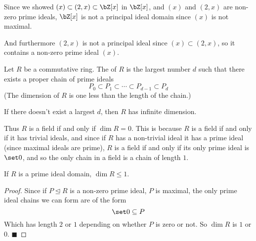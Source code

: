 \documentclass[10pt]{article}
\let\ideal=\trianglelefteq
\def\qed{\hskip1cm\hbox{}\hfill$\blacksquare$}
\begin{document}
Since we showed $(x)\subset(2,x)\subset\bZ[x]$ in $\bZ[x]$, and $(x)$ and $(2,x)$ are non-zero prime ideals, $\bZ[x]$ is not a principal ideal domain since $(x)$ is not maximal.

And furthermore $(2,x)$ is not a principal ideal since $(x)\subset(2,x)$, so it contains a non-zero prime ideal $(x)$.

\begin{defn*}

    Let $R$ be a commutative ring.
    The  of $R$ is the largest number $d$ such that there exists a proper chain of prime ideals 
    \[ P_0 \subset P_1 \subset \cdots \subset P_{d-1} \subset P_d \]
    (The dimension of $R$ is one less than the length of the chain.)

    If there doesn't exist a largest $d$, then $R$ has infinite dimension.

\end{defn*}

Thus $R$ is a field if and only if $\dim R=0$.
This is because $R$ is a field if and only if it has trivial ideals, and since if $R$ has a non-trivial ideal it has a prime ideal (since maximal ideals are prime), $R$ is a field if and only if its only
prime ideal is $\set 0$, and so the only chain in a field is a chain of length $1$.

\begin{prop*}

    If $R$ is a prime ideal domain, $\dim R\leq1$.

\end{prop*}

\begin{proof}

    Since if $P\ideal R$ is a non-zero prime ideal, $P$ is maximal, the only prime ideal chains we can form are of the form
    \[ \set 0 \subseteq P \]
    Which has length $2$ or $1$ depending on whether $P$ is zero or not.
    So $\dim R$ is $1$ or $0$.
    \qed

\end{proof}
\end{document}
